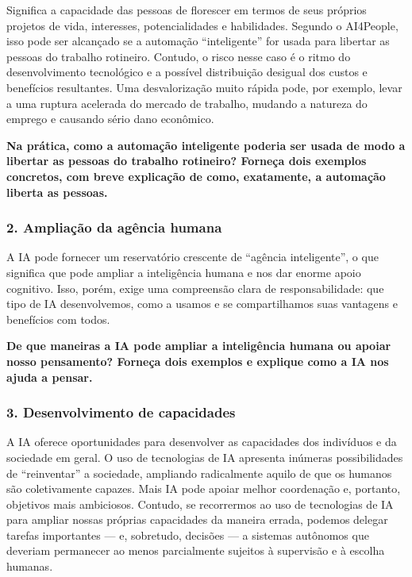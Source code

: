 \documentclass[
  11pt,
]{article}
\renewenvironment{quote}
  {\begin{tcolorbox}[
      breakable, enhanced jigsaw, rounded corners,
      arc=3pt, boxrule=0pt, frame hidden,
      colback=iaCaso,
      borderline west={3pt}{0pt}{iaRiscos},
      left=12pt, right=10pt, top=9pt, bottom=9pt,
      before skip=9pt, after skip=9pt]}
  {\end{tcolorbox}}
\begin{document}
Significa a capacidade das pessoas de florescer em termos de seus
próprios projetos de vida, interesses, potencialidades e habilidades.
Segundo o AI4People, isso pode ser alcançado se a automação
``inteligente'' for usada para libertar as pessoas do trabalho
rotineiro. Contudo, o risco nesse caso é o ritmo do desenvolvimento
tecnológico e a possível distribuição desigual dos custos e benefícios
resultantes. Uma desvalorização muito rápida pode, por exemplo, levar a
uma ruptura acelerada do mercado de trabalho, mudando a natureza do
emprego e causando sério dano econômico.

\begin{quote}
\textbf{Na prática, como a automação inteligente poderia ser usada de
modo a libertar as pessoas do trabalho rotineiro? Forneça dois exemplos
concretos, com breve explicação de como, exatamente, a automação liberta
as pessoas.}
\end{quote}

\hypertarget{ampliauxe7uxe3o-da-aguxeancia-humana}{%
\subsubsection{2. Ampliação da agência
humana}\label{ampliauxe7uxe3o-da-aguxeancia-humana}}

A IA pode fornecer um reservatório crescente de ``agência inteligente'',
o que significa que pode ampliar a inteligência humana e nos dar enorme
apoio cognitivo. Isso, porém, exige uma compreensão clara de
responsabilidade: que tipo de IA desenvolvemos, como a usamos e se
compartilhamos suas vantagens e benefícios com todos.

\begin{quote}
\textbf{De que maneiras a IA pode ampliar a inteligência humana ou
apoiar nosso pensamento? Forneça dois exemplos e explique como a IA nos
ajuda a pensar.}
\end{quote}

\hypertarget{desenvolvimento-de-capacidades}{%
\subsubsection{3. Desenvolvimento de
capacidades}\label{desenvolvimento-de-capacidades}}

A IA oferece oportunidades para desenvolver as capacidades dos
indivíduos e da sociedade em geral. O uso de tecnologias de IA apresenta
inúmeras possibilidades de ``reinventar'' a sociedade, ampliando
radicalmente aquilo de que os humanos são coletivamente capazes. Mais IA
pode apoiar melhor coordenação e, portanto, objetivos mais ambiciosos.
Contudo, se recorrermos ao uso de tecnologias de IA para ampliar nossas
próprias capacidades da maneira errada, podemos delegar tarefas
importantes --- e, sobretudo, decisões --- a sistemas autônomos que
deveriam permanecer ao menos parcialmente sujeitos à supervisão e à
escolha humanas.
\end{document}
